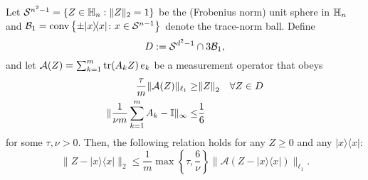 \begin{proposition} \label{prop:nsp_implication}
  Let $\mathcal{S}^{n^2-1}=\left\{ Z \in \mathbb{H}_n: \| Z \|_2=1 \right\}$ be the (Frobenius norm) unit sphere in $\mathbb{H}_n$ and $\mathcal{B}_1 = \mathrm{conv} \left\{ \pm | x \rangle \! \langle  x| \colon  x \in \mathcal{S}^{n-1} \right\}$ denote the trace-norm ball.
  Define
  \[
    D := \mathcal{S}^{d^2-1} \cap 3 \mathcal{B}_1, \label{eq:D}
  \]
  and let $\mathcal{A}(Z) = \sum_{k=1}^m \operatorname{tr} (A_k Z ) \,  e_k$ be a measurement operator that obeys
  \begin{align}
      \frac{ \tau}{m} \| \mathcal{A}(Z) \|_{\ell_1} \geq& {\Vert Z\Vert}_2 \quad \forall Z \in D \label{eq:nsp}\\
      \| \frac{1}{\nu m}\sum_{k=1}^m A_k -  \mathbb{I} \|_\infty \leq& \frac{1}{6}\label{eq:approx_povm}
  \end{align}
  for some $\tau,\nu >0$.
  Then, the following relation holds for any $Z \geq 0$ and any $|{x} \rangle \! \langle {x}|$:
  \[
    \| Z - |{x} \rangle \! \langle {x}| \|_2 \leq \frac{1}{m} \max \left\{ \tau, \frac{6}{\nu} \right\}  \| \mathcal{A}(Z-|{x} \rangle \! \langle {x}|) \|_{\ell_1}. \label{eq:rec_guarantee}
  \]
\end{proposition}



